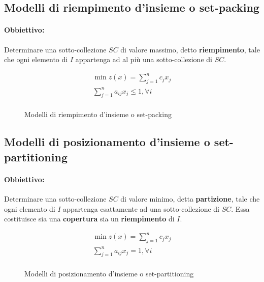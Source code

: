 \documentclass[\main/main.tex]{subfiles}
\begin{document}
\subsection{Modelli di riempimento d'insieme o set-packing}
\paragraph*{Obbiettivo:} Determinare una sotto-collezione $SC$ di valore massimo, detto \textbf{riempimento}, tale che ogni elemento di $I$ appartenga ad al più una sotto-collezione di $SC$.


\begin{figure}
  \begin{align*}
    \min z(x) = \sum_{j=1}^n c_j x_j          \\
    \sum_{j=1}^n a_{ij} x_j \leq 1, \forall i \\
  \end{align*}
  \caption{Modelli di riempimento d'insieme o set-packing}
\end{figure}

\subsection{Modelli di posizionamento d'insieme o set-partitioning}
\paragraph*{Obbiettivo:} Determinare una sotto-collezione $SC$ di valore minimo, detta \textbf{partizione}, tale che ogni elemento di $I$ appartenga esattamente ad una sotto-collezione di $SC$. Essa costituisce sia una \textbf{copertura} sia un \textbf{riempimento} di $I$.

\begin{figure}
  \begin{align*}
    \min z(x) = \sum_{j=1}^n c_j x_j       \\
    \sum_{j=1}^n a_{ij} x_j = 1, \forall i \\
  \end{align*}
  \caption{Modelli di posizionamento d'insieme o set-partitioning}
\end{figure}
\end{document}
